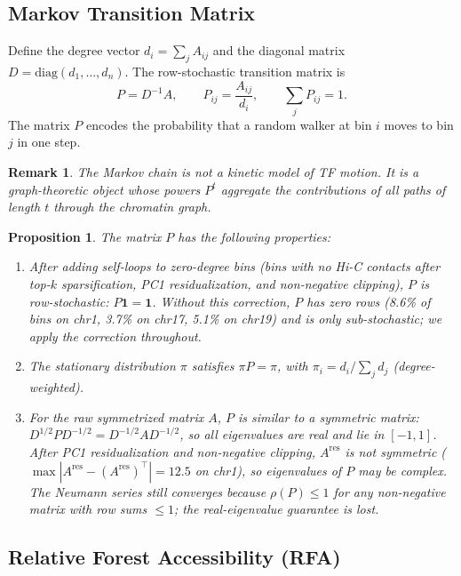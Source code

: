\documentclass[11pt,a4paper]{article}
\newtheorem{proposition}{Proposition}
\newtheorem{remark}{Remark}
\begin{document}
\subsection{Markov Transition Matrix}

Define the degree vector $d_i = \sum_j A_{ij}$ and the diagonal matrix $D = \mathrm{diag}(d_1, \dots, d_n)$. The row-stochastic transition matrix is
\begin{equation}
P = D^{-1} A, \qquad P_{ij} = \frac{A_{ij}}{d_i}, \qquad \sum_j P_{ij} = 1.
\end{equation}
The matrix $P$ encodes the probability that a random walker at bin $i$ moves to bin $j$ in one step.

\begin{remark}
The Markov chain is \emph{not} a kinetic model of TF motion. It is a graph-theoretic object whose powers $P^t$ aggregate the contributions of all paths of length $t$ through the chromatin graph.
\end{remark}

\begin{proposition}
The matrix $P$ has the following properties:
\begin{enumerate}
    \item After adding self-loops to zero-degree bins (bins with no Hi-C contacts after top-$k$ sparsification, PC1 residualization, and non-negative clipping), $P$ is row-stochastic: $P \mathbf{1} = \mathbf{1}$. Without this correction, $P$ has zero rows (8.6\% of bins on chr1, 3.7\% on chr17, 5.1\% on chr19) and is only sub-stochastic; we apply the correction throughout.
    \item The stationary distribution $\pi$ satisfies $\pi P = \pi$, with $\pi_i = d_i / \sum_j d_j$ (degree-weighted).
    \item For the \emph{raw} symmetrized matrix $A$, $P$ is similar to a symmetric matrix: $D^{1/2} P D^{-1/2} = D^{-1/2} A D^{-1/2}$, so all eigenvalues are real and lie in $[-1,1]$. After PC1 residualization and non-negative clipping, $A^{\mathrm{res}}$ is not symmetric ($\max|A^{\mathrm{res}} - (A^{\mathrm{res}})^\top| = 12.5$ on chr1), so eigenvalues of $P$ may be complex. The Neumann series still converges because $\rho(P) \le 1$ for any non-negative matrix with row sums $\le 1$; the real-eigenvalue guarantee is lost.
\end{enumerate}
\end{proposition}

\subsection{Relative Forest Accessibility (RFA)}
\end{document}
